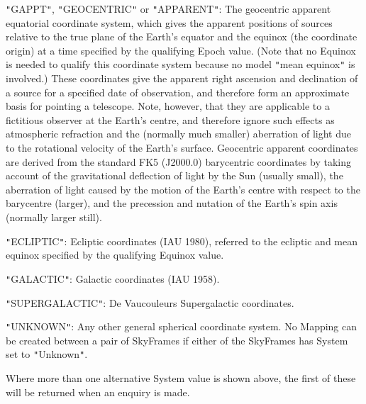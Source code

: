 \documentclass[twoside,11pt]{article}
\newcommand{\htmlref}[2]{#1}
\begin{document}
{{{         \sstitem
         {\tt{"}}GAPPT{\tt{"}}, {\tt{"}}GEOCENTRIC{\tt{"}} or {\tt{"}}APPARENT{\tt{"}}: The geocentric apparent
         equatorial coordinate system, which gives the apparent positions
         of sources relative to the true plane of the Earth's equator and
         the equinox (the coordinate origin) at a time specified by the
         qualifying Epoch value. (Note that no Equinox is needed to
         qualify this coordinate system because no model {\tt{"}}mean equinox{\tt{"}}
         is involved.)  These coordinates give the apparent right
         ascension and declination of a source for a specified date of
         observation, and therefore form an approximate basis for
         pointing a telescope. Note, however, that they are applicable to
         a fictitious observer at the Earth's centre, and therefore
         ignore such effects as atmospheric refraction and the (normally
         much smaller) aberration of light due to the rotational velocity
         of the Earth's surface.  Geocentric apparent coordinates are
         derived from the standard FK5 (J2000.0) barycentric coordinates
         by taking account of the gravitational deflection of light by
         the Sun (usually small), the aberration of light caused by the
         motion of the Earth's centre with respect to the barycentre
         (larger), and the precession and nutation of the Earth's spin
         axis (normally larger still).

         \sstitem
         {\tt{"}}ECLIPTIC{\tt{"}}: Ecliptic coordinates (IAU 1980), referred to the
         ecliptic and mean equinox specified by the qualifying Equinox
         value.

         \sstitem
         {\tt{"}}GALACTIC{\tt{"}}: Galactic coordinates (IAU 1958).

         \sstitem
         {\tt{"}}SUPERGALACTIC{\tt{"}}: De Vaucouleurs Supergalactic coordinates.

         \sstitem
         {\tt{"}}UNKNOWN{\tt{"}}: Any other general spherical coordinate system. No
         \htmlref{Mapping}{Mapping} can be created between a pair of SkyFrames if either of the
         SkyFrames has System set to {\tt{"}}Unknown{\tt{"}}.

      }
      Where more than one alternative System value is shown above, the
      first of these will be returned when an enquiry is made.
   }
}
\end{document}
